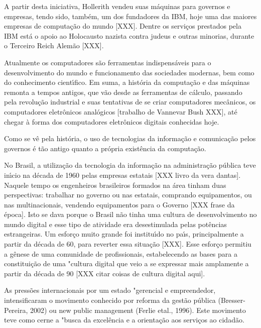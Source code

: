 \documentclass[
12pt,		%
openright,	%
twoside,  %
a4paper,			%
chapter=TITLE,		%
english,			%
french,				%
spanish,			%
brazil				%
]{USPSC-classe/USPSC}
\begin{document}
A partir desta iniciativa, Hollerith vendeu suas m\'aquinas para governos e empresas, tendo sido, tamb\'em, um dos fundadores da IBM, hoje uma das maiores empresas de computa\c{c}\~ao do mundo [XXX]. Dentre os servi\c{c}os prestados pela IBM est\'a o apoio ao Holocausto nazista contra judeus e outras minorias, durante o Terceiro Reich Alem\~ao [XXX].




Atualmente os computadores s\~ao ferramentas indispens\'aveis para o desenvolvimento do mundo e funcionamento das sociedades modernas, bem como do conhecimento cient\'{\i}fico. Em suma, a hist\'oria da computa\c{c}\~ao e das m\'aquinas remonta a tempos antigos, que v\~ao desde as ferramentas de c\'alculo, passando pela revolu\c{c}\~ao industrial e suas tentativas de se criar computadores mec\^anicos, os computadores eletr\^onicos anal\'ogicos [trabalho de Vannevar Bush XXX], at\'e chegar \`a forma dos computadores eletr\^onicos digitais conhecidas hoje.




Como se v\^e pela hist\'oria, o uso de tecnologias da informa\c{c}\~ao e comunica\c{c}\~ao pelos governos \'e t\~ao antigo quanto a pr\'opria exist\^encia da computa\c{c}\~ao.




No Brasil, a utiliza\c{c}\~ao da tecnologia da informa\c{c}\~ao na administra\c{c}\~ao p\'ublica teve in\'{\i}cio na d\'ecada de 1960 pelas empresas estatais [XXX livro da vera dantas]. Naquele tempo os engenheiros brasileiros formados na \'area tinham duas perspectivas: trabalhar no governo ou nas estatais, comprando equipamentos, ou nas multinacionais, vendendo equipamentos para o Governo [XXX frase da \'epoca]. Isto se dava porque o Brasil n\~ao tinha uma cultura de desenvolvimento no mundo digital e esse tipo de atividade era desestimulada pelas pot\^encias estrangeiras. Um esfor\c{c}o muito grande foi institu\'{\i}do no pa\'{\i}s, principalmente a partir da d\'ecada de 60, para reverter essa situa\c{c}\~ao [XXX]. Esse esfor\c{c}o permitiu a g\^enese de uma comunidade de profissionais, estabelecendo as bases para a constitui\c{c}\~ao de uma "cultura digital que veio a se expressar mais amplamente a partir da d\'ecada de 90 [XXX citar coisas de cultura digital aqui].




As press\~oes internacionais por um estado "gerencial e empreendedor, intensificaram o movimento conhecido por reforma da gest\~ao p\'ublica (Bresser-Pereira, 2002) ou new public management (Ferlie etal., 1996). Este movimento teve como cerne a "busca da excel\^encia e a orienta\c{c}\~ao aos servi\c{c}os ao cidad\~ao.
\end{document}
